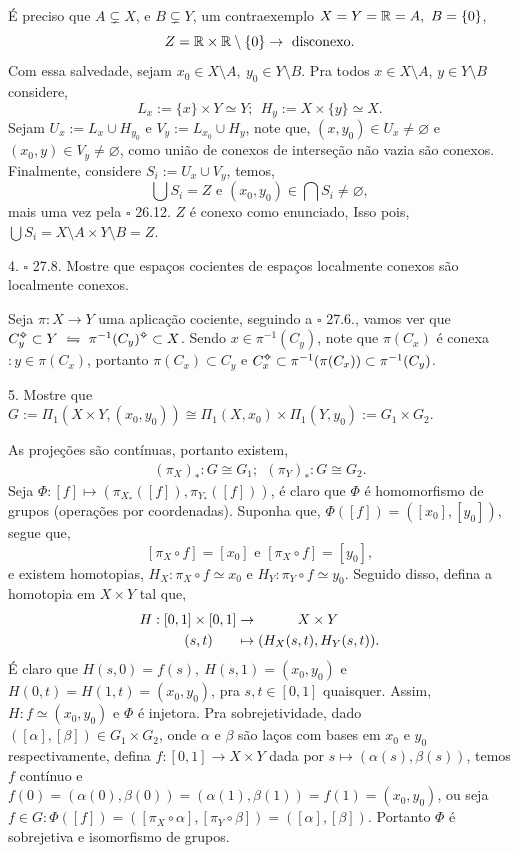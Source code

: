 \textcolor{gris}{
É preciso que \(A\subsetneq X\), e \(B\subsetneq Y\), um contraexemplo \(X = Y = \mathbb{R} = A , \ B= \{0\}\), \[ Z  = \mathbb{R} \times \mathbb{R}\setminus \{0\} \rightarrow  \ \text{disconexo}.\]
Com essa salvedade, sejam \(x_0 \in X\setminus A, \ y_0 \in Y\setminus B\). Pra todos \(x \in X\setminus A\), \(y \in Y\setminus B\) considere, 
\[L_x := \{x\} \times Y\simeq Y; \ \ H_y := X \times \{y\}\simeq X.\]   
Sejam \(U_x := L_x \cup H_{y_0}\) e  \(V_y := L_{x_0} \cup H_y \), note que, \((x,y_0) \in U_x\neq \varnothing\) e \((x_0,y) \in V_y \neq \varnothing\), como união de conexos de interseção não vazia são conexos. Finalmente, considere \(S_i := U_x \cup V_y\), temos,  
\[\bigcup S_i =  Z \text{ \ \ e \ \ } (x_0,y_0) \in \bigcap S_i \neq \varnothing, \] 
mais uma vez pela \(\square \) 26.12. \(Z\) é conexo como enunciado, Isso pois, \(\bigcup S_i = X\setminus A\times Y\setminus B = Z\). 
}

4. \(\square \) 27.8. Mostre que espaços cocientes de espaços localmente conexos são localmente conexos. 

\textcolor{gris}{Seja \(\pi: X\to Y\) uma aplicação cociente, seguindo a \(\square \) 27.6., vamos ver que \(C_y\ab \subset Y \ \leftrightharpoons \ \pi^{-1}(C_y) \ab \subset X\). Sendo \(x\in \pi^{-1}(C_y)\), note que \(\pi(C_x)\) é conexa \(: y \in \pi(C_x)\), portanto \(\pi(C_x) \subset C_y\)  e 
\(C_x\ab  \subset \pi^{-1} (\pi(C_x)) \subset \pi^{-1}(C_y)\). 
}

5. Mostre que \(G := \Pi_1 (X\times Y, (x_0,y_0)) \cong \Pi_1(X, x_0) \times \Pi_1(Y,y_0):= G_1 \times G_2\). 

\textcolor{gris}{As projeções são contínuas, portanto existem, 
\begin{align*}
  (\pi_X)_{*} :G \cong G_1; \ \ (\pi_{Y})_{*} : G \cong G_2.  
\end{align*}
Seja \(\Phi: [f] \mapsto  (\pi_{X_*}([f]), \pi_{Y_*}([f]))\), é claro que \(\Phi\) é homomorfismo de grupos (operações por coordenadas). Suponha que, \(\Phi([f]) = ([x_0], [y_0])\), segue que,    
\[[\pi_X \circ f] = [x_0] \text{ \ \ e \ \ }[\pi_X \circ f] = [y_0], \]
e existem homotopias, \(H_X: \pi_X \circ f \simeq x_0 \) e \(H_Y: \pi_Y \circ f \simeq y_0\). Seguido disso, defina a homotopia em \(X \times Y\) tal que,  
\begin{align*}
  H : [0,1]\times [0,1] &\to\hspace{1cm} X\times Y  \\ 
 (s,t) \hspace{0.6cm}&\mapsto (H_X(s,t), H_Y(s,t)) .
\end{align*}
É claro que \(H(s,0) = f(s), \ H(s,1) = (x_0,y_0)\) e \(H(0,t) =  H(1,t) = (x_0,y_0)\), pra \(s, t \in [0,1] \) quaisquer. Assim, \(H: f \simeq (x_0,y_0)\) e \(\Phi\) é injetora. Pra sobrejetividade, dado \(([\alpha], [\beta]) \in G_1 \times G_2\), onde \(\alpha\) e \(\beta\) são laços com bases em \(x_0\) e \(y_0\) respectivamente, defina \(f : [0,1] \to X\times Y\) dada por \(s \mapsto (\alpha(s), \beta(s))\), temos \(f\) contínuo e \(f(0) = (\alpha(0), \beta(0)) = (\alpha(1), \beta(1)) = f(1) =  (x_0,y_0) \), ou seja \( f \in G : \Phi ([f]) = ([\pi_X \circ \alpha], [\pi_Y \circ \beta]) = ([\alpha], [\beta])\). Portanto \(\Phi\) é sobrejetiva e isomorfismo de grupos.   
}


